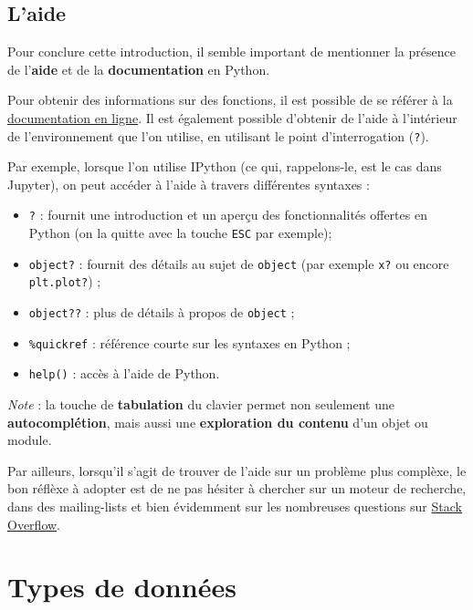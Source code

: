 \documentclass[12pt,]{book}
\providecommand{\tightlist}{%
  \setlength{\itemsep}{0pt}\setlength{\parskip}{0pt}}
\numberwithin{equation}{section}
\numberwithin{countremarque}{section}
\begin{document}
\section{L'aide}\label{laide}

Pour conclure cette introduction, il semble important de mentionner la
présence de l'\textbf{aide} et de la \textbf{documentation} en Python.

Pour obtenir des informations sur des fonctions, il est possible de se
référer à la \href{https://docs.python.org/3/}{documentation en ligne}.
Il est également possible d'obtenir de l'aide à l'intérieur de
l'environnement que l'on utilise, en utilisant le point d'interrogation
(\texttt{?}).

Par exemple, lorsque l'on utilise IPython (ce qui, rappelons-le, est le
cas dans Jupyter), on peut accéder à l'aide à travers différentes
syntaxes :

\begin{itemize}
\tightlist
\item
  \texttt{?} : fournit une introduction et un aperçu des fonctionnalités
  offertes en Python (on la quitte avec la touche \texttt{ESC} par
  exemple);
\item
  \texttt{object?} : fournit des détails au sujet de
  \texttt{\textquotesingle{}object\textquotesingle{}} (par exemple
  \texttt{x?} ou encore \texttt{plt.plot?}) ;
\item
  \texttt{object??} : plus de détails à propos de
  \texttt{\textquotesingle{}object\textquotesingle{}} ;
\item
  \texttt{\%quickref} : référence courte sur les syntaxes en Python ;
\item
  \texttt{help()} : accès à l'aide de Python.
\end{itemize}

\emph{Note} : la touche de \textbf{tabulation} du clavier permet non
seulement une \textbf{autocomplétion}, mais aussi une
\textbf{exploration du contenu} d'un objet ou module.

Par ailleurs, lorsqu'il s'agit de trouver de l'aide sur un problème plus
complèxe, le bon réflèxe à adopter est de ne pas hésiter à chercher sur
un moteur de recherche, dans des mailing-lists et bien évidemment sur
les nombreuses questions sur \href{https://stackoverflow.com}{Stack
Overflow}.

\chapter{Types de données}\label{types-de-donnees}
\end{document}
